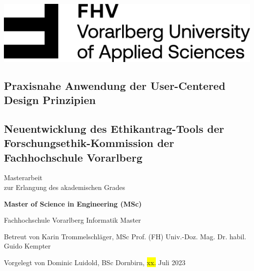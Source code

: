 \documentclass[a4paper,12pt,twoside]{scrreprt}
\begin{document}

\begin{titlepage}
    \begin{flushright}
    \includegraphics[width=0.4\linewidth]{images/FHV_FHV-Logo.png}
    \end{flushright}
    \vspace{1cm}

    \begin{flushleft}
    \section*{Praxisnahe Anwendung der User-Centered Design Prinzipien}
    \subsection*{Neuentwicklung des Ethikantrag-Tools der Forschungsethik-Kommission der Fachhochschule Vorarlberg}
    \vspace{1cm}

    Masterarbeit\\
    zur Erlangung des akademischen Grades
    \vspace{0.5cm}

    \textbf{Master of Science in Engineering (MSc)}

    \vspace{1cm}
    Fachhochschule Vorarlberg\newline
    Informatik Master

    \vspace{0.5cm}

    Betreut von\newline
    Karin Trommelschläger, MSc\newline
    Prof. (FH) Univ.-Doz. Mag. Dr. habil. Guido Kempter

    \vspace{0.5cm}

    Vorgelegt von\newline
    Dominic Luidold, BSc\newline
    Dornbirn, \colorbox{yellow}{xx.} Juli 2023
    \end{flushleft}
\end{titlepage}

\cleardoublepage
{}
\end{document}
